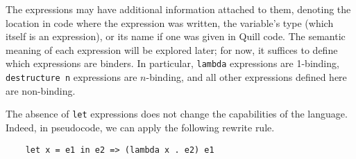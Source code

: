 \documentclass[UKenglish, 11pt, a4paper, parskip=half]{scrbook}
\newcommand{\code}[1]{\lstinline{#1}}
\theoremstyle{definition}
\begin{document}

The expressions may have additional information attached to them, denoting the location in code where the expression was written, the variable's type (which itself is an expression), or its name if one was given in Quill code.
The semantic meaning of each expression will be explored later; for now, it suffices to define which expressions are binders.
In particular, \code{lambda} expressions are 1-binding, \code{destructure n} expressions are \( n \)-binding, and all other expressions defined here are non-binding.

The absence of \code{let} expressions does not change the capabilities of the language.
Indeed, in pseudocode, we can apply the following rewrite rule.
\begin{lstlisting}
    let x = e1 in e2 => (lambda x . e2) e1
\end{lstlisting}

\backmatter

\printbibliography
\end{document}
